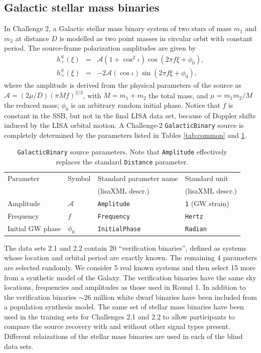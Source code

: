 \documentclass[12pt]{iopart}
\begin{document}
\subsection{Galactic stellar mass binaries}
\label{ss:WD}

In Challenge 2, a Galactic stellar mass binary system of two stars of mass $m_1$ and $m_2$ at distance $D$  is modelled as two point masses in circular orbit with constant period. The source-frame polarization amplitudes are given by
%
\begin{eqnarray}
h^S_+(\xi)  & = & \mathcal{A} \left(1 + \cos^2{\iota}\right) \cos(2\pi f \xi + \phi_0), \\
h^S_\times(\xi) & = & -2 \mathcal{A} (\cos{\iota}) \sin(2\pi f \xi + \phi_0), \nonumber
\end{eqnarray}
%
where the amplitude is derived from the physical parameters of the source as $\mathcal{A} = (2 \mu / D) (\pi M f)^{2/3}$, with $M = m_1 + m_2$ the total mass, and $\mu = m_1 m_2 / M $ the reduced mass; $ \phi_0$ is an arbitrary random initial phase. Notice that $f$ is constant in the SSB, but not in the final LISA data set, because of Doppler shifts induced by the LISA orbital motion.
A Challenge-2 \texttt{GalacticBinary} source is completely determined by the parameters listed in Tables \ref{tab:common} and \ref{tab:galactic}.
%
\begin{table}
\begin{tabular}{llll}
\hline
{Parameter} &
{Symbol} &
{Standard parameter name} &
{Standard unit} \\
& & (lisaXML descr.) & (lisaXML descr.) \\
\hline
Amplitude           & $\mathcal{A}$ & \texttt{Amplitude}    & \texttt{1} (GW strain) \\
Frequency           & $f$           & \texttt{Frequency}    & \texttt{Hertz} \\
Initial GW phase    & $\phi_0$      & \texttt{InitialPhase} & \texttt{Radian} \\
\hline
\end{tabular}
\caption{\texttt{GalacticBinary} source parameters. Note that \texttt{Amplitude} effectively replaces the standard \texttt{Distance} parameter.\label{tab:galactic}}
\end{table}

The data sets 2.1 and 2.2 contain 20 ``verification binaries'', defined as systems whose location and orbital period are exactly known. The remaining 4 parameters are selected randomly. We consider 5 real known systems and then select 15 more from a synthetic model of the Galaxy. The verification binaries have the same sky locations, frequencies and amplitudes as those used in Round 1. In addition to the verification binaries $\sim 26$ million
white dwarf binaries have been included from a population synthesis model. The same set of stellar mass binaries have been used in the training sets for Challenges 2.1 and 2.2 to allow participants to compare the source recovery with and without other signal types present. Different relaizations of the stellar mass binaries are used in each of the blind data sets.
\end{document}
